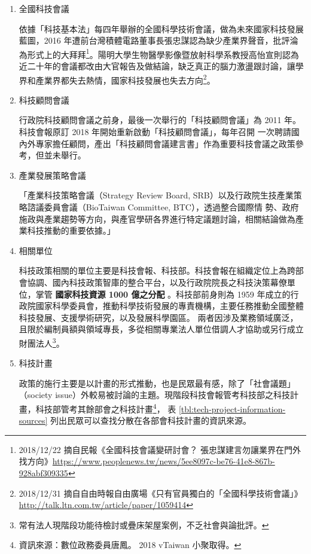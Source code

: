 \documentclass[12pt,a4paper]{article}
\begin{document}
\begin{enumerate}
\item 全國科技會議
\label{sec:orgc6c4609}

依據「科技基本法」每四年舉辦的全國科學技術會議，做為未來國家科技發展藍圖，2016 年遭前台灣積體電路董事長張忠謀認為缺少產業界聲音，批評淪為形式上的大拜拜\footnote{2018/12/22 摘自民報《全國科技會議變研討會？ 張忠謀建言勿讓業界在門外找方向》\url{https://www.peoplenews.tw/news/5ee8097c-be76-41e8-867b-928abf309335}}。陽明大學生物醫學影像暨放射科學系教授高怡宣則認為近二十年的會議都改由大官報告及做結論，缺乏真正的腦力激盪跟討論，讓學界和產業界都失去熱情，國家科技發展也失去方向\footnote{2018/12/31 摘自自由時報自由廣場《只有官員獨白的「全國科學技術會議」》 \url{http://talk.ltn.com.tw/article/paper/1059414}}。
\item 科技顧問會議
\label{sec:org3c4dfcb}

行政院科技顧問會議之前身，最後一次舉行的「科技顧問會議」為 2011 年。科技會報原訂 2018 年開始重新啟動「科技顧問會議」，每年召開 一次聘請國內外專家擔任顧問，產出「科技顧問會議建言書」作為重要科技會議之政策參考，但並未舉行。
\item 產業發展策略會議
\label{sec:orgfdeba7c}

「產業科技策略會議（Strategy Review Board, SRB）以及行政院生技產業策略諮議委員會議（BioTaiwan Committee, BTC），透過整合國際情
勢、政府施政與產業趨勢等方向，與產官學研各界進行特定議題討論，相關結論做為產業科技推動的重要依據。」\citep{guo17}
\item 相關單位
\label{sec:orgfa98667}

科技政策相關的單位主要是科技會報、科技部。科技會報在組織定位上為跨部會協調、國內科技政策智庫的整合平台，以及行政院院長之科技決策幕僚單位，掌管 \textbf{國家科技資源 1000 億之分配} 。科技部前身則為 1959 年成立的行政院國家科學委員會，推動科學技術發展的專責機構，主要任務推動全國整體科技發展、支援學術研究，以及發展科學園區。
兩者因涉及業務領域廣泛，且限於編制員額與領域專長，多從相關專業法人單位借調人才協助或另行成立財團法人\footnote{常有法人現階段功能待檢討或疊床架屋案例，不乏社會與論批評。}。
\item 科技計畫
\label{sec:orgc1de95e}

政策的施行主要是以計畫的形式推動，也是民眾最有感，除了「社會議題」（society issue）外較易被討論的主題。現階段科技會報管考科技部之科技計畫，科技部管考其餘部會之科技計畫\footnote{資訊來源：數位政務委員唐鳳。 2018 vTaiwan 小聚取得。}， 表 \ref{tbl:tech-project-information-sources} 列出民眾可以查找分散在各部會科技計畫的資訊來源。


\end{enumerate}
\end{document}
